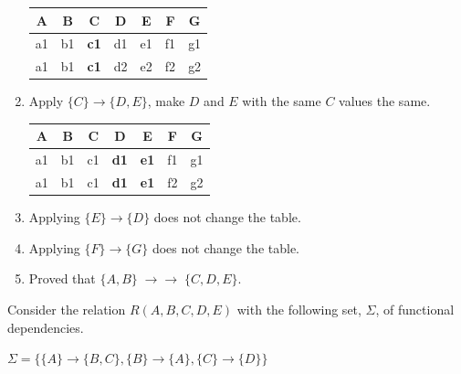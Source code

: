 \documentclass[10pt,a4paper,answers]{exam}
\newcommand {\mvd}{\mbox{$\; \rightarrow \! \! \! \! \rightarrow \; $}}
\newcounter{sol}
\begin{document}
\begin{questions}
\begin{parts}
\begin{solution}
\begin{enumerate}
		\begin{center}
			\centering
			\begin{tabular}{|c|c|c|c|c|c|c|}
				\hline
				\rowcolor[HTML]{EFEFEF} 
				\textbf{A} & \textbf{B} & \textbf{C} & \textbf{D} & \textbf{E} & {\color[HTML]{333333} \textbf{F}} & \textbf{G} \\ \hline
				a1         & b1         & \textbf{c1}         & d1         & e1         & f1         & g1                       \\ \hline
				a1         & b1         & \textbf{c1}         & d2         & e2         & f2         & g2                       \\ \hline
			\end{tabular}
		\end{center}
		\item Apply $\{C\} \rightarrow \{D,E\}$, make $D$ and $E$ with the same $C$ values the same.
	
	\begin{center}
		\centering
		\begin{tabular}{|c|c|c|c|c|c|c|}
			\hline
			\rowcolor[HTML]{EFEFEF} 
			\textbf{A} & \textbf{B} & \textbf{C} & \textbf{D} & \textbf{E} & {\color[HTML]{333333} \textbf{F}} & \textbf{G} \\ \hline
			a1         & b1         & c1         & \textbf{d1}         & \textbf{e1}         & f1         & g1                       \\ \hline
			a1         & b1         & c1         & \textbf{d1}         & \textbf{e1}         & f2         & g2                       \\ \hline
		\end{tabular}
	\end{center}

	\item Applying $\{E\} \rightarrow \{D\}$ does not change the table.
	
	\item Applying $\{F\} \rightarrow \{G\}$ does not change the table.
	\item Proved that $\{A, B\} \mvd \{C,D,E\}$.
		\end{enumerate}
	\end{solution}
\end{parts}


\question Consider the  relation $R(A, B, C, D, E)$ with the following set, $\Sigma$, of functional dependencies. 

$\Sigma = \{ \{A\} \rightarrow \{B, C\}, \{B\} \rightarrow \{A\}, \{C\} \rightarrow \{D\}\}$


\end{questions}
\end{document}
